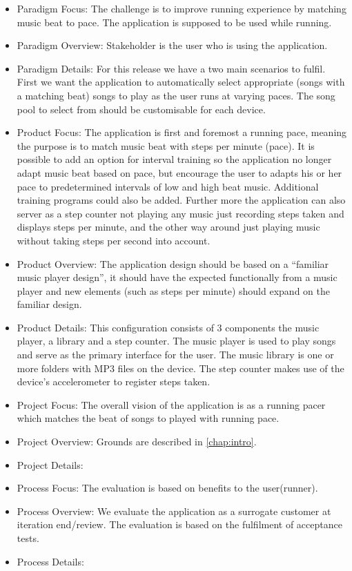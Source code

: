 \begin{itemize}
\item Paradigm Focus: The challenge is to improve running experience by matching music beat to pace. The application is supposed to be used while running.
\item Paradigm Overview: Stakeholder is the user who is using the application.
\item Paradigm Details: For this release we have a two main scenarios to fulfil. First we want the application to automatically select appropriate (songs with a matching beat) songs to play as the user runs at varying paces. The song pool to select from should be customisable for each device.
\item Product Focus: The application is first and foremost a running pace, meaning the purpose is to match music beat with steps per minute (pace). It is possible to add an option for interval training so the application no longer adapt music beat based on pace, but encourage the user to adapts his or her pace to predetermined intervals of low and high beat music. Additional training programs could also be added. Further more the application can also server as a step counter not playing any music just recording steps taken and displays steps per minute, and the other way around just playing music without taking steps per second into account.
\item Product Overview: The application design should be based on a ``familiar music player design'', it should have the expected functionally from a music player and new elements (such as steps per minute) should expand on the familiar design. 
\item Product Details: This configuration consists of 3 components the music player, a library and a step counter. The music player is used to play songs and serve as the primary interface for the user. The music library is one or more folders with MP3 files on the device. The step counter makes use of the device's accelerometer to register steps taken.
\item Project Focus: The overall vision of the application is as a running pacer which matches the beat of songs to played with running pace.
\item Project Overview: Grounds are described in \cref{chap:intro}.
\item Project Details: 
\item Process Focus: The evaluation is based on benefits to the user(runner).
\item Process Overview: We evaluate the application as a surrogate customer at iteration end/review. The evaluation is based on the fulfilment of acceptance tests.
\item Process Details: 

\end{itemize}